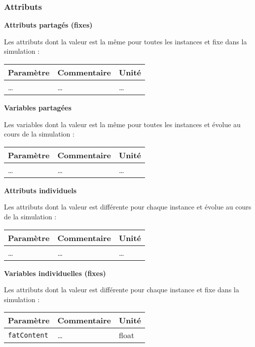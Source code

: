 \documentclass[
]{article}
\begin{document}
\subsubsection{Attributs}\label{attributs-12}

\textbf{Attributs partagés (fixes)}

Les attributs dont la valeur est la même pour toutes les instances et
fixe dans la simulation :

\begin{longtable}[]{@{}lll@{}}
\toprule\noalign{}
\textbf{Paramètre} & \textbf{Commentaire} & \textbf{Unité} \\
\midrule\noalign{}
\endhead
\bottomrule\noalign{}
\endlastfoot
\ldots{} & \ldots{} & \ldots{} \\
\end{longtable}

\textbf{Variables partagées}

Les variables dont la valeur est la même pour toutes les instances et
évolue au cours de la simulation :

\begin{longtable}[]{@{}lll@{}}
\toprule\noalign{}
\textbf{Paramètre} & \textbf{Commentaire} & \textbf{Unité} \\
\midrule\noalign{}
\endhead
\bottomrule\noalign{}
\endlastfoot
\ldots{} & \ldots{} & \ldots{} \\
\end{longtable}

\textbf{Attributs individuels}

Les attributs dont la valeur est différente pour chaque instance et
évolue au cours de la simulation :

\begin{longtable}[]{@{}lll@{}}
\toprule\noalign{}
\textbf{Paramètre} & \textbf{Commentaire} & \textbf{Unité} \\
\midrule\noalign{}
\endhead
\bottomrule\noalign{}
\endlastfoot
\ldots{} & \ldots{} & \ldots{} \\
\end{longtable}

\textbf{Variables individuelles (fixes)}

Les attributs dont la valeur est différente pour chaque instance et fixe
dans la simulation :

\begin{longtable}[]{@{}lll@{}}
\toprule\noalign{}
\textbf{Paramètre} & \textbf{Commentaire} & \textbf{Unité} \\
\midrule\noalign{}
\endhead
\bottomrule\noalign{}
\endlastfoot
\texttt{fatContent} & \ldots{} & float \\
\end{longtable}
\end{document}
